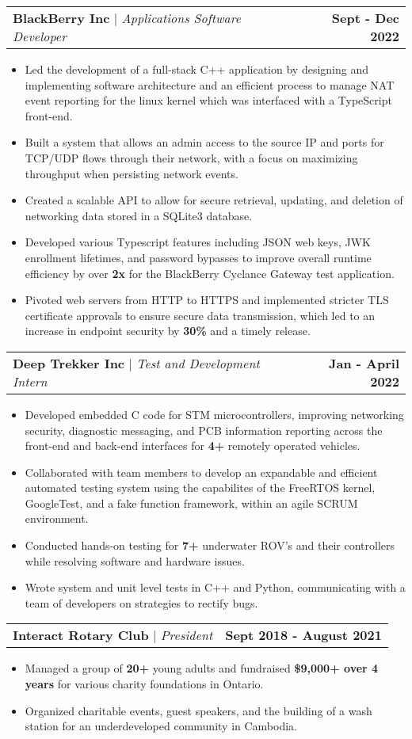 \documentclass[letterpaper,11pt]{article}
\makeatletter
\newcommand{\subItem}[1]{
  \item\small{{#1 \vspace{-2pt}}}}
\newcommand{\subHeading}[2]{
  \vspace{-5pt}\item
  \begin{tabular*}{1.001\textwidth}{l@{\extracolsep{\fill}}r}
    \small#1 & \textbf{\small #2} 
    \setlength{\parskip}{6pt}
  \end{tabular*}\vspace{-7pt}}
\newcommand{\subItemListStart}{\begin{itemize}}
\newcommand{\subItemListEnd}{\end{itemize}\vspace{-5pt}}
\makeatother
\begin{document}
    \subHeading
      {\textbf{BlackBerry Inc} $|$ \emph{Applications Software Developer}}
      {Sept - Dec 2022}
    \subItemListStart
      \subItem{Led the development of a full-stack C++ application by designing and implementing software architecture and an efficient process to manage NAT event reporting for the linux kernel which was interfaced with a TypeScript front-end.}
      \subItem{Built a system that allows an admin access to the source IP and ports for TCP/UDP flows through their network, with a focus on maximizing throughput when persisting network events.}
      \subItem{Created a scalable API to allow for secure retrieval, updating, and deletion of networking data stored in a SQLite3 database.}
      \subItem{Developed various Typescript features including JSON web keys, JWK enrollment lifetimes, and password bypasses to improve overall runtime efficiency by over \textbf{2x} for the BlackBerry Cyclance Gateway test application.}
      \subItem{Pivoted web servers from HTTP to HTTPS and implemented stricter TLS certificate approvals to ensure secure data transmission, which led to an increase in endpoint security by \textbf{30\%} and a timely release.}
    \subItemListEnd
    \vspace{-13pt}

    \subHeading
      {\textbf{Deep Trekker Inc} $|$ \emph{Test and Development Intern}}
      {Jan - April 2022}
    \subItemListStart
      \subItem{Developed embedded C code for STM microcontrollers, improving networking security, diagnostic messaging, and PCB information reporting across the front-end and back-end interfaces for \textbf{4+} remotely operated vehicles.}
      \subItem{Collaborated with team members to develop an expandable and efficient automated testing system using the capabilites of the FreeRTOS kernel, GoogleTest, and a fake function framework, within an agile SCRUM environment.}
      \subItem{Conducted hands-on testing for \textbf{7+} underwater ROV's and their controllers while resolving software and hardware issues.}
      \subItem{Wrote system and unit level tests in C++ and Python, communicating with a team of developers on strategies to rectify bugs.}
    \subItemListEnd
    \vspace{-13pt}

    \subHeading
      {\textbf{Interact Rotary Club} $|$ \emph{President}}
      {Sept 2018 - August 2021}
    \subItemListStart
      \subItem{Managed a group of \textbf{20+} young adults and fundraised \textbf{\$9,000+ over 4 years} for various charity foundations in Ontario.}
      \subItem{Organized charitable events, guest speakers, and the building of a wash station for an underdeveloped community in Cambodia.}
    \subItemListEnd
\end{document}
